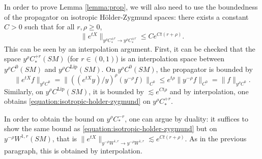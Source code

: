 \documentclass[JEP,XML,SOM,Unicode,NoFloatCountersInSection]{cedram}
\theoremstyle{plain}
\theoremstyle{definition}
\begin{document}
{\color{black}In order to prove Lemma \ref{lemma:prop}, we will also need to use the boundedness of the propagator on isotropic Hölder-Zygmund spaces: there exists a constant $C > 0$ such that for all $r, \rho \geq 0$,
\begin{equation}
\label{equation:isotropic-holder-zygmund}
\|e^{tX}\|_{y^\rho C^{\pm r}_* \to y^\rho C^{\pm r}_*} \leq C e^{Ct(r+\rho)}.
\end{equation}
This can be seen by an interpolation argument. First, it can be checked that the space $y^\rho C^{+r}_*(SM)$ (for $r \in (0,1)$) is an interpolation space between $y^\rho C^0(SM)$ and $y^\rho C^{\mathrm{Lip}}(SM)$. On $y^\rho C^0(SM)$, the propagator is bounded by
\[
\|e^{tX} f\|_{y^\rho C^0} = \|((e^{tX}y)/y)^\rho (y^{-\rho} f)\|_{C^0} \leq e^{t \rho} \|y^{-\rho} f\|_{C^0} = \|f\|_{y^\rho C^0}.
\]
Similarly, on $y^\rho C^{\mathrm{Lip}}(SM)$, it is bounded by $\lesssim e^{Ct \rho}$ and by interpolation, one obtains \eqref{equation:isotropic-holder-zygmund} on $y^\rho C^{+ r}_*$.

In order to obtain the bound on $y^\rho C^{- r}_*$, one can argue by duality: it suffices to show the same bound as \eqref{equation:isotropic-holder-zygmund} but on $y^{-\rho} W^{1,r}(SM)$, that is $\|e^{tX}\|_{y^{-\rho}W^{1,r} \to y^{-\rho}W^{1,r}} \lesssim e^{Ct(r+\rho)}$. As in the previous paragraph, this is obtained by interpolation.}
\end{document}
